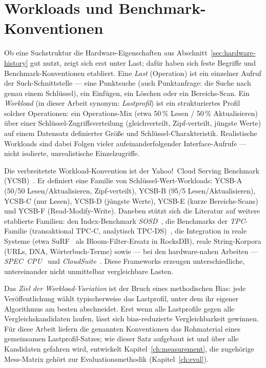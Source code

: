 \section{Workloads und Benchmark-Konventionen}\label{sec:workload-basics-known}
Ob eine Suchstruktur die Hardware-Eigenschaften aus Abschnitt~\ref{sec:hardware-history} gut nutzt,
zeigt sich erst unter Last; dafür haben sich feste Begriffe und Benchmark-Konventionen etabliert. Eine
\emph{Last} (Operation) ist ein einzelner Aufruf der Such-Schnittstelle --- eine Punktsuche
(auch Punktanfrage: die Suche nach genau einem Schlüssel), ein Einfügen, ein Löschen oder ein
Bereichs-Scan. Ein \emph{Workload} (in dieser Arbeit synonym:
\emph{Lastprofil}) ist ein strukturiertes Profil solcher
Operationen: ein Operations-Mix (etwa 50\,\% Lesen / 50\,\% Aktualisieren) über einer
Schlüssel-Zugriffsverteilung (gleichverteilt, Zipf-verteilt, jüngste Werte) auf einem Datensatz
definierter Größe und Schlüssel-Charakteristik. Realistische Workloads sind dabei Folgen
vieler aufeinanderfolgender Interface-Aufrufe --- nicht isolierte, unrealistische Einzelzugriffe.

Die verbreitetste Workload-Konvention ist der Yahoo!\ Cloud Serving Benchmark
(YCSB)~\cite{cooper2010ycsb}. Er definiert eine Familie von Schlüssel-Wert-Workloads: YCSB-A (50/50
Lesen/Aktualisieren, Zipf-verteilt), YCSB-B (95/5 Lesen/Aktualisieren), YCSB-C (nur Lesen), YCSB-D
(jüngste Werte), YCSB-E (kurze Bereichs-Scans) und YCSB-F (Read-Modify-Write). Daneben stützt sich die
Literatur auf weitere etablierte Familien: den Index-Benchmark \emph{SOSD}~\cite{kipf2019sosd}, die
Benchmarks der \emph{TPC}-Familie (transaktional TPC-C, analytisch TPC-DS)~\cite{tpc_benchmarks}, die Integration
in reale Systeme (etwa SuRF~\cite{zhang2018surf} als Bloom-Filter-Ersatz in RocksDB), reale
String-Korpora (URLs, DNA, Wörterbuch-Terme) sowie --- bei den hardware-nahen Arbeiten ---
\emph{SPEC~CPU}~\cite{spec_cpu2017} und \emph{CloudSuite}~\cite{ferdman2012cloudsuite}. Diese
Frameworks erzeugen unterschiedliche, untereinander nicht unmittelbar vergleichbare Lasten.

Das \emph{Ziel der Workload-Variation} ist der Bruch eines methodischen Bias: jede Veröffentlichung
wählt typischerweise das Lastprofil, unter dem ihr eigener Algorithmus am besten abschneidet. Erst wenn
alle Lastprofile gegen alle Vergleichskandidaten laufen, lässt sich bias-reduzierte Vergleichbarkeit
gewinnen. Für diese Arbeit liefern die genannten Konventionen das Rohmaterial eines gemeinsamen
Lastprofil-Satzes; wie dieser Satz aufgebaut ist und über alle Kandidaten gefahren wird, entwickelt
Kapitel~\ref{ch:measurement}, die zugehörige Mess-Matrix gehört zur Evaluationsmethodik
(Kapitel~\ref{ch:eval}).

